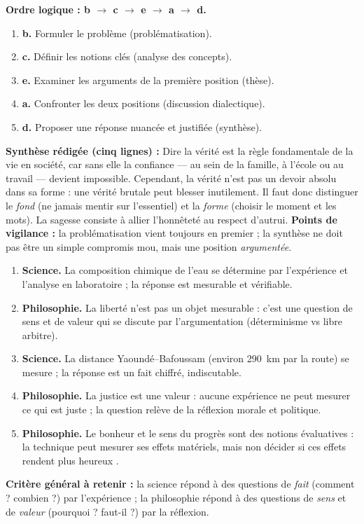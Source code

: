 \documentclass[11pt]{article}
\begin{document}
\begin{corrige}
\textbf{Ordre logique : b $\rightarrow$ c $\rightarrow$ e $\rightarrow$ a $\rightarrow$ d.}
\begin{enumerate}
\item \textbf{b.} Formuler le problème (problématisation).
\item \textbf{c.} Définir les notions clés (analyse des concepts).
\item \textbf{e.} Examiner les arguments de la première position (thèse).
\item \textbf{a.} Confronter les deux positions (discussion dialectique).
\item \textbf{d.} Proposer une réponse nuancée et justifiée (synthèse).
\end{enumerate}
\textbf{Synthèse rédigée (cinq lignes) :} Dire la vérité est la règle fondamentale de la vie en société, car sans elle la confiance — au sein de la famille, à l'école ou au travail — devient impossible. Cependant, la vérité n'est pas un devoir absolu dans sa forme : une vérité brutale peut blesser inutilement. Il faut donc distinguer le \emph{fond} (ne jamais mentir sur l'essentiel) et la \emph{forme} (choisir le moment et les mots). La sagesse consiste à allier l'honnêteté au respect d'autrui.
\textbf{Points de vigilance :} la problématisation vient toujours en premier ; la synthèse ne doit pas être un simple compromis mou, mais une position \emph{argumentée}.
\end{corrige}

\begin{corrige}
\begin{enumerate}
\item \textbf{Science.} La composition chimique de l'eau se détermine par l'expérience et l'analyse en laboratoire ; la réponse est mesurable et vérifiable.
\item \textbf{Philosophie.} La liberté n'est pas un objet mesurable : c'est une question de sens et de valeur qui se discute par l'argumentation (déterminisme vs libre arbitre).
\item \textbf{Science.} La distance Yaoundé--Bafoussam (environ \SI{290}{km} par la route) se mesure ; la réponse est un fait chiffré, indiscutable.
\item \textbf{Philosophie.} La justice est une valeur : aucune expérience ne peut mesurer ce qui est \og juste \fg{} ; la question relève de la réflexion morale et politique.
\item \textbf{Philosophie.} Le bonheur et le sens du progrès sont des notions évaluatives : la technique peut mesurer ses effets matériels, mais non décider si ces effets rendent \og plus heureux \fg{}.
\end{enumerate}
\textbf{Critère général à retenir :} la science répond à des questions de \emph{fait} (comment ? combien ?) par l'expérience ; la philosophie répond à des questions de \emph{sens} et de \emph{valeur} (pourquoi ? faut-il ?) par la réflexion.
\end{corrige}
\end{document}
